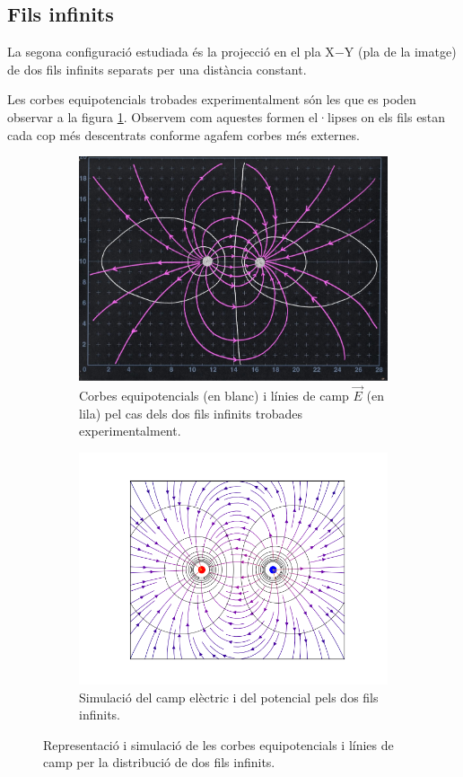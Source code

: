 \documentclass[a4paper,10.5pt]{report}
\begin{document}
\subsection{Fils infinits}
La segona configuració estudiada és la projecció en el pla X$-$Y (pla de la imatge) de dos fils infinits separats per una distància constant. 

Les corbes equipotencials trobades experimentalment són les que es poden observar a la figura \ref{fig:1.3a}. Observem com aquestes formen el·lipses on els fils estan cada cop més descentrats conforme agafem corbes més externes. 
\begin{figure}[h]
	\centering
	\begin{subfigure}{0.45\linewidth}
		\centering
		\includegraphics[width=\linewidth]{screenshot004}
		\caption{Corbes equipotencials (en blanc) i línies de camp $\vec{E}$ (en lila) pel cas dels dos fils infinits trobades experimentalment.}
		\label{fig:1.3a}
	\end{subfigure}
	\hfill
	\begin{subfigure}{0.5\linewidth}
		\centering
		\includegraphics[width=\linewidth]{figfils}
		\caption{Simulació del camp elèctric i del potencial pels dos fils infinits.}
		\label{fig:1.3b}
	\end{subfigure}
	\caption{Representació i simulació de les corbes equipotencials i línies de camp per la distribució de dos fils infinits.}
	\label{fig:1.3}
\end{figure}
\end{document}
